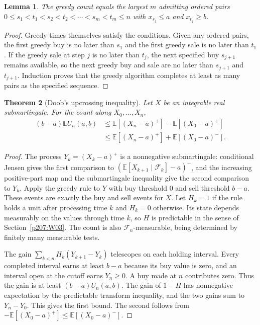 \documentclass[11pt,oneside,openany]{book}
\theoremstyle{plain}
\newtheorem{theorem}{Theorem}[chapter]
\newtheorem{lemma}[theorem]{Lemma}
\theoremstyle{definition}
\theoremstyle{remark}
\begin{document}
\begin{lemma}\label{p207:greedy}
The greedy count equals the largest \(m\) admitting ordered
pairs \(0\le s_1<t_1<s_2<t_2<\cdots<s_m<t_m\le n\) with
\(x_{s_j}\le a\) and \(x_{t_j}\ge b\).
\end{lemma}
\begin{proof}
Greedy times themselves satisfy the conditions. Given any
ordered pairs, the first greedy buy is no later than \(s_1\)
and the first greedy sale is no later than \(t_1\). If the
greedy sale at step \(j\) is no later than \(t_j\), the next
specified buy \(s_{j+1}\) remains available, so the next greedy
buy and sale are no later than \(s_{j+1}\) and \(t_{j+1}\).
Induction proves that the greedy algorithm completes at
least as many pairs as the specified sequence.
\end{proof}

\begin{theorem}[Doob's upcrossing inequality]\label{p207:upcross}
Let \(X\) be an integrable real submartingale. For the count
along \(X_0,\ldots,X_n\),
\begin{align*}
 (b-a)\mathbb E U_n(a,b)
  &\le \mathbb E[(X_n-a)^+]-\mathbb E[(X_0-a)^+]\\
  &\le \mathbb E[(X_n-a)^+]+\mathbb E[(X_0-a)^-].
\end{align*}
\end{theorem}
\begin{proof}
The process \(Y_k=(X_k-a)^+\) is a nonnegative submartingale:
conditional Jensen gives the first comparison to
\((\mathbb E[X_{k+1}\mid\mathcal F_k]-a)^+\), and the increasing
positive-part map and the submartingale inequality give the
second comparison to \(Y_k\). Apply the greedy rule to \(Y\)
with buy threshold \(0\) and sell threshold \(b-a\). These
events are exactly the buy and sell events for \(X\).
Let \(H_k=1\) if the rule holds a unit after processing time \(k\)
and \(H_k=0\) otherwise. Its state depends measurably on the
values through time \(k\), so \(H\) is predictable in the sense
of Section~\ref{p207:W03}. The count is also \(\mathcal F_n\)-measurable,
being determined by finitely many measurable tests.

The gain \(\sum_{k<n}H_k(Y_{k+1}-Y_k)\) telescopes on each
holding interval. Every completed interval earns at least
\(b-a\) because its buy value is zero, and an interval open
at the cutoff earns \(Y_n\ge0\). A buy made at \(n\) contributes
zero. Thus the gain is at least \((b-a)U_n(a,b)\).
The gain of \(1-H\) has nonnegative expectation by the
predictable transform inequality, and the two gains sum to
\(Y_n-Y_0\). This gives the first bound. The second follows
from \(-\mathbb E[(X_0-a)^+]\le \mathbb E[(X_0-a)^-]\).
\end{proof}
\end{document}
